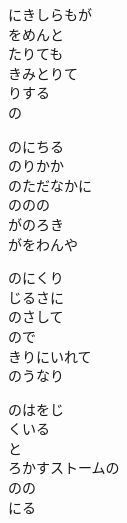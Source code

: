 \documentclass[10pt,b5j]{tarticle} %
\begin{document}
\vspace{1.5em} %
\newcommand{\linespace}{0.5em} %
\newcommand{\blocksize}{0.5\hsize} %
\begin{enumerate} %
    \begin{minipage}[c]{\blocksize}
    
        \vspace{\linespace}
        \item
        にきしらもが\\
        をめんと\\
        たりても\\
        きみとりて\\
        りする\\
        の
        
        \vspace{\linespace}
        \item
        のにちる\\
        のりかか\\
        のただなかに\\
        ののの\\
        がのろき\\
        がをわんや
        
        \vspace{\linespace}
        \item
        のにくり\\
        じるさに\\
        のさして\\
        ので\\
        きりにいれて\\
        のうなり
        
        \vspace{\linespace}
        \item
        のはをじ\\
        くいる\\
        と\\
        ろかすストームの\\
        のの\\
        にる
        

\end{minipage}
\end{enumerate}
\end{document}
